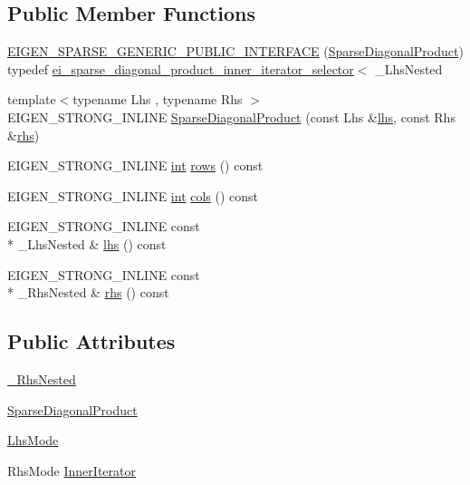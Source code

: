 \subsection*{Public Member Functions}
\begin{DoxyCompactItemize}
\item 
\hyperlink{class_sparse_diagonal_product_ae51e599dba95790d2da726d19f65d83d}{E\-I\-G\-E\-N\-\_\-\-S\-P\-A\-R\-S\-E\-\_\-\-G\-E\-N\-E\-R\-I\-C\-\_\-\-P\-U\-B\-L\-I\-C\-\_\-\-I\-N\-T\-E\-R\-F\-A\-C\-E} (\hyperlink{class_sparse_diagonal_product}{Sparse\-Diagonal\-Product}) typedef \hyperlink{classei__sparse__diagonal__product__inner__iterator__selector}{ei\-\_\-sparse\-\_\-diagonal\-\_\-product\-\_\-inner\-\_\-iterator\-\_\-selector}$<$ \-\_\-\-Lhs\-Nested
\item 
{\footnotesize template$<$typename Lhs , typename Rhs $>$ }\\E\-I\-G\-E\-N\-\_\-\-S\-T\-R\-O\-N\-G\-\_\-\-I\-N\-L\-I\-N\-E \hyperlink{class_sparse_diagonal_product_afee924769564744a9f4bca877ab5213b}{Sparse\-Diagonal\-Product} (const Lhs \&\hyperlink{class_sparse_diagonal_product_afd1b09fb2a27b791807e0dbd15c02e4a}{lhs}, const Rhs \&\hyperlink{class_sparse_diagonal_product_a8a6a6054cf62f5f321aca3732babd3ea}{rhs})
\item 
E\-I\-G\-E\-N\-\_\-\-S\-T\-R\-O\-N\-G\-\_\-\-I\-N\-L\-I\-N\-E \hyperlink{ioapi_8h_a787fa3cf048117ba7123753c1e74fcd6}{int} \hyperlink{class_sparse_diagonal_product_a5f54e97adba2c5c524a9976b591e1822}{rows} () const 
\item 
E\-I\-G\-E\-N\-\_\-\-S\-T\-R\-O\-N\-G\-\_\-\-I\-N\-L\-I\-N\-E \hyperlink{ioapi_8h_a787fa3cf048117ba7123753c1e74fcd6}{int} \hyperlink{class_sparse_diagonal_product_a8d69857492b0571a686d0ac4cf9ff8d7}{cols} () const 
\item 
E\-I\-G\-E\-N\-\_\-\-S\-T\-R\-O\-N\-G\-\_\-\-I\-N\-L\-I\-N\-E const \\*
\-\_\-\-Lhs\-Nested \& \hyperlink{class_sparse_diagonal_product_afd1b09fb2a27b791807e0dbd15c02e4a}{lhs} () const 
\item 
E\-I\-G\-E\-N\-\_\-\-S\-T\-R\-O\-N\-G\-\_\-\-I\-N\-L\-I\-N\-E const \\*
\-\_\-\-Rhs\-Nested \& \hyperlink{class_sparse_diagonal_product_a8a6a6054cf62f5f321aca3732babd3ea}{rhs} () const 
\end{DoxyCompactItemize}
\subsection*{Public Attributes}
\begin{DoxyCompactItemize}
\item 
\hyperlink{class_sparse_diagonal_product_aa7951adc124933483ec1b352bd50dc6a}{\-\_\-\-Rhs\-Nested}
\item 
\hyperlink{class_sparse_diagonal_product_ab407e484e54948f2b4aeb9b22dc53ec3}{Sparse\-Diagonal\-Product}
\item 
\hyperlink{class_sparse_diagonal_product_ab32872fb8d003cf17900c0675eeb5c4b}{Lhs\-Mode}
\item 
Rhs\-Mode \hyperlink{class_sparse_diagonal_product_a5c59ad27902daf0a0fe9ef17c892a18d}{Inner\-Iterator}
\end{DoxyCompactItemize}
